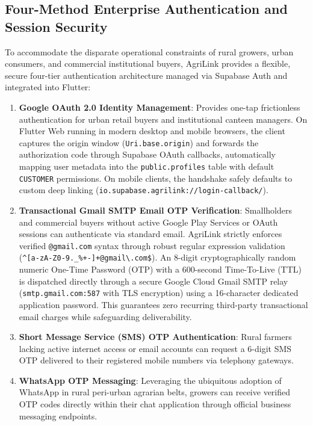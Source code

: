 \subsection{Four-Method Enterprise Authentication and Session Security}
\label{subsec:auth_design}
To accommodate the disparate operational constraints of rural growers, urban consumers, and commercial institutional buyers, AgriLink provides a flexible, secure four-tier authentication architecture managed via Supabase Auth and integrated into Flutter:
\begin{enumerate}
    \item \textbf{Google OAuth 2.0 Identity Management}: Provides one-tap frictionless authentication for urban retail buyers and institutional canteen managers. On Flutter Web running in modern desktop and mobile browsers, the client captures the origin window (\texttt{Uri.base.origin}) and forwards the authorization code through Supabase OAuth callbacks, automatically mapping user metadata into the \texttt{public.profiles} table with default \texttt{CUSTOMER} permissions. On mobile clients, the handshake safely defaults to custom deep linking (\texttt{io.supabase.agrilink://login-callback/}).
    \item \textbf{Transactional Gmail SMTP Email OTP Verification}: Smallholders and commercial buyers without active Google Play Services or OAuth sessions can authenticate via standard email. AgriLink strictly enforces verified \texttt{@gmail.com} syntax through robust regular expression validation (\texttt{\textasciicircum[a-zA-Z0-9.\_\%+-]+@gmail\textbackslash.com\$}). An 8-digit cryptographically random numeric One-Time Password (OTP) with a 600-second Time-To-Live (TTL) is dispatched directly through a secure Google Cloud Gmail SMTP relay (\texttt{smtp.gmail.com:587} with TLS encryption) using a 16-character dedicated application password. This guarantees zero recurring third-party transactional email charges while safeguarding deliverability.
    \item \textbf{Short Message Service (SMS) OTP Authentication}: Rural farmers lacking active internet access or email accounts can request a 6-digit SMS OTP delivered to their registered mobile numbers via telephony gateways.
    \item \textbf{WhatsApp OTP Messaging}: Leveraging the ubiquitous adoption of WhatsApp in rural peri-urban agrarian belts, growers can receive verified OTP codes directly within their chat application through official business messaging endpoints.
\end{enumerate}

